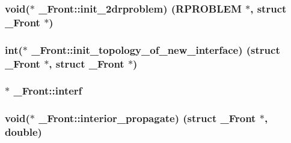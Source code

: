 \subsubsection[{\texorpdfstring{init\+\_\+2drproblem}{init_2drproblem}}]{\setlength{\rightskip}{0pt plus 5cm}void($\ast$ \+\_\+\+Front\+::init\+\_\+2drproblem) ({\bf R\+P\+R\+O\+B\+L\+EM} $\ast$, struct {\bf \+\_\+\+Front} $\ast$)}\hypertarget{struct___front_aeb65d347cab5c980f5b384bacd224795}{}\label{struct___front_aeb65d347cab5c980f5b384bacd224795}
\subsubsection[{\texorpdfstring{init\+\_\+topology\+\_\+of\+\_\+new\+\_\+interface}{init_topology_of_new_interface}}]{\setlength{\rightskip}{0pt plus 5cm}int($\ast$ \+\_\+\+Front\+::init\+\_\+topology\+\_\+of\+\_\+new\+\_\+interface) (struct {\bf \+\_\+\+Front} $\ast$, struct {\bf \+\_\+\+Front} $\ast$)}\hypertarget{struct___front_ac272e066ab77f70f17eb01c667084805}{}\label{struct___front_ac272e066ab77f70f17eb01c667084805}
\subsubsection[{\texorpdfstring{interf}{interf}}]{$\ast$ \+\_\+\+Front\+::interf}\hypertarget{struct___front_a96e2c542c046bedb66e696584b5f51d4}{}\label{struct___front_a96e2c542c046bedb66e696584b5f51d4}
\subsubsection[{\texorpdfstring{interior\+\_\+propagate}{interior_propagate}}]{\setlength{\rightskip}{0pt plus 5cm}void($\ast$ \+\_\+\+Front\+::interior\+\_\+propagate) (struct {\bf \+\_\+\+Front} $\ast$, double)}\hypertarget{struct___front_a3dc80df04161736b2a6600ee17dbb00f}{}\label{struct___front_a3dc80df04161736b2a6600ee17dbb00f}
